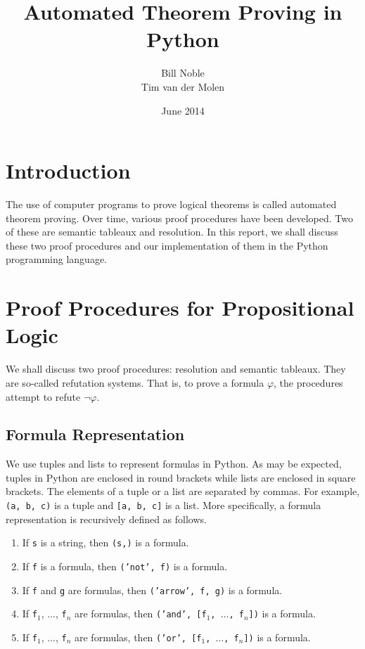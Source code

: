 \documentclass[a4paper,notitlepage]{scrartcl}
\title{Automated Theorem Proving in Python}
\author{Bill Noble\\ Tim van der Molen}
\date{June 2014}
\let\phi\varphi
\begin{document}
\maketitle

\section{Introduction}

The use of computer programs to prove logical theorems is called automated
theorem proving. Over time, various proof procedures have been developed. Two
of these are semantic tableaux and resolution. In this report, we shall discuss
these two proof procedures and our implementation of them in the Python
programming language.

\section{Proof Procedures for Propositional Logic}

We shall discuss two proof procedures: resolution and semantic tableaux. They
are so-called refutation systems. That is, to prove a formula $\phi$, the
procedures attempt to refute $\lnot\phi$.

\subsection{Formula Representation}

We use tuples and lists to represent formulas in Python.
As may be expected, tuples in Python are enclosed in round brackets while lists
are enclosed in square brackets.
The elements of a tuple or a list are separated by commas.
For example, \texttt{(a, b, c)} is a tuple and \texttt{[a, b, c]} is a list.
More specifically, a formula representation is recursively defined as follows.

\begin{enumerate}

\item
If \texttt{s} is a string, then \texttt{(s,)} is a formula.

\item
If \texttt{f} is a formula, then \texttt{('not', f)} is a formula.

\item
If \texttt{f} and \texttt{g} are formulas, then \texttt{('arrow', f, g)} is a
formula.

\item
If \texttt{f}$_1$, $\ldots$, \texttt{f}$_n$ are formulas, then \texttt{('and',
[f$_1$, $\ldots$, f$_n$])} is a formula.

\item
If \texttt{f}$_1$, $\ldots$, \texttt{f}$_n$ are formulas, then \texttt{('or',
[f$_1$, $\ldots$, f$_n$])} is a formula.
\end{enumerate}
\end{document}
